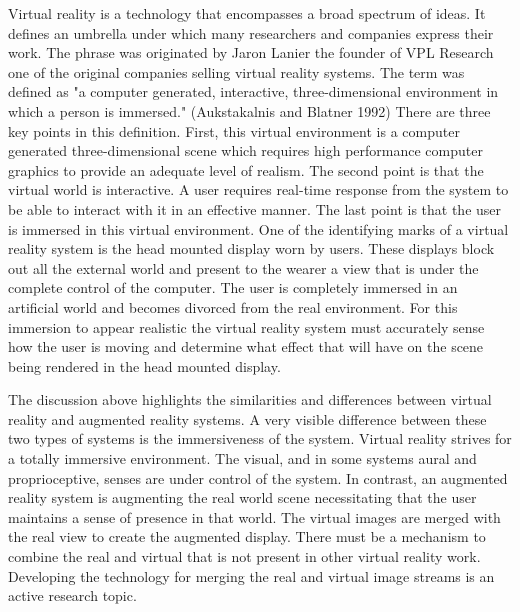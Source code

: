 Virtual reality is a technology that encompasses a broad spectrum of ideas. It defines an umbrella under which many researchers and companies express their work. The phrase was originated by Jaron Lanier the founder of VPL Research one of the original companies selling virtual reality systems. The term was defined as "a computer generated, interactive, three-dimensional environment in which a person is immersed." (Aukstakalnis and Blatner 1992) There are three key points in this definition. First, this virtual environment is a computer generated three-dimensional scene which requires high performance computer graphics to provide an adequate level of realism. The second point is that the virtual world is interactive. A user requires real-time response from the system to be able to interact with it in an effective manner. The last point is that the user is immersed in this virtual environment. One of the identifying marks of a virtual reality system is the head mounted display worn by users. These displays block out all the external world and present to the wearer a view that is under the complete control of the computer. The user is completely immersed in an artificial world and becomes divorced from the real environment. For this immersion to appear realistic the virtual reality system must accurately sense how the user is moving and determine what effect that will have on the scene being rendered in the head mounted display.

The discussion above highlights the similarities and differences between virtual reality and augmented reality systems. A very visible difference between these two types of systems is the immersiveness of the system. Virtual reality strives for a totally immersive environment. The visual, and in some systems aural and proprioceptive, senses are under control of the system. In contrast, an augmented reality system is augmenting the real world scene necessitating that the user maintains a sense of presence in that world. The virtual images are merged with the real view to create the augmented display. There must be a mechanism to combine the real and virtual that is not present in other virtual reality work. Developing the technology for merging the real and virtual image streams is an active research topic.

